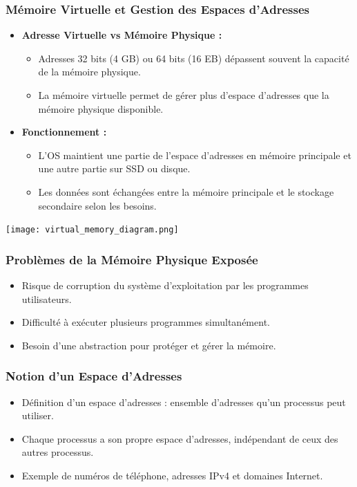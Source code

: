 \documentclass{beamer}
\begin{document}
\begin{frame}
\frametitle{Mémoire Virtuelle et Gestion des Espaces d'Adresses}
\begin{itemize}
    \item \textbf{Adresse Virtuelle vs Mémoire Physique :}
    \begin{itemize}
        \item Adresses 32 bits (4 GB) ou 64 bits (16 EB) dépassent souvent la capacité de la mémoire physique.
        \item La mémoire virtuelle permet de gérer plus d'espace d'adresses que la mémoire physique disponible.
    \end{itemize}
    \item \textbf{Fonctionnement :}
    \begin{itemize}
        \item L'OS maintient une partie de l'espace d'adresses en mémoire principale et une autre partie sur SSD ou disque.
        \item Les données sont échangées entre la mémoire principale et le stockage secondaire selon les besoins.
    \end{itemize}
\end{itemize}
\texttt{[image: virtual\_memory\_diagram.png]}
\end{frame}





\begin{frame}
\frametitle{Problèmes de la Mémoire Physique Exposée}
\begin{itemize}
    \item Risque de corruption du système d'exploitation par les programmes utilisateurs.
    \item Difficulté à exécuter plusieurs programmes simultanément.
    \item Besoin d'une abstraction pour protéger et gérer la mémoire.
\end{itemize}
\end{frame}

\begin{frame}
\frametitle{Notion d'un Espace d'Adresses}
\begin{itemize}
    \item Définition d'un espace d'adresses : ensemble d'adresses qu'un processus peut utiliser.
    \item Chaque processus a son propre espace d'adresses, indépendant de ceux des autres processus.
    \item Exemple de numéros de téléphone, adresses IPv4 et domaines Internet.
\end{itemize}
\end{frame}
\end{document}
